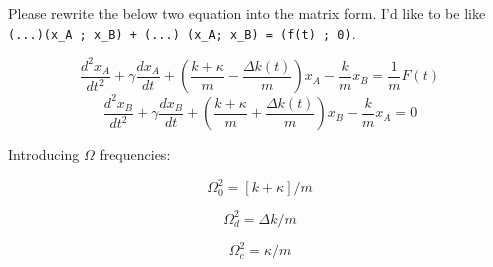\begin{ai}
Please rewrite the below two equation into the matrix form. I'd like to be like
\verb|(...)(x_A ; x_B) + (...) (x_A; x_B) = (f(t) ; 0)|.

\[
  \frac{d^2x_A}{dt^2} + \gamma \frac{dx_A}{dt} + \left(\frac{k + \kappa}{m} - \frac{\Delta
    k(t)}{m}\right)x_A -\frac{k}{m}x_B = \frac{1}{m}F(t)
\]
\[
  \frac{d^2x_B}{dt^2} + \gamma \frac{dx_B}{dt} + \left(\frac{k + \kappa}{m} + \frac{\Delta
    k(t)}{m}\right)x_B -\frac{k}{m}x_A = 0
\]

Introducing $\Omega$ frequencies:

\[
  \Omega_0^2 = [k + \kappa]/m
\]

\[
  \Omega_d^2 = \Delta k / m
\]

\[
  \Omega_c^2 = \kappa / m
\]


\end{ai}

